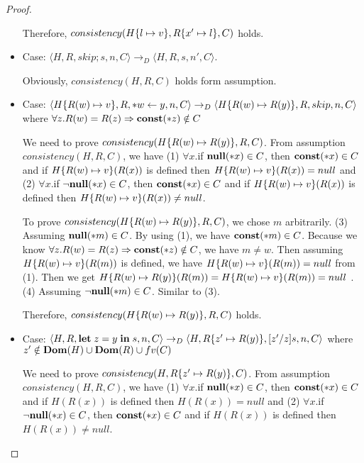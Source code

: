 \begin{proof}
\begin{itemize}
    Therefore, \(consistency(H\{l \mapsto v\}, R\{x' \mapsto l\},
    C )\) holds.

\item Case: \(\langle H, R, skip;s, n, C \rangle \rightarrow_D
    \langle H, R, s, n', C \rangle \).

    Obviously, \(consistency(H, R, C) \) holds form assumption.

\item Case: \(\langle H\{R(w) \mapsto v\}, R, *w \leftarrow y, n, C
  \rangle \rightarrow_D \langle H\{R(w) \mapsto R(y)\}, R, skip, n, C
  \rangle \) where \( \forall z. R(w) = R(z) \Rightarrow \mathbf{const}(*z)
  \notin C \)

    We need to prove \(consistency(H\{R(w) \mapsto R(y)\}, R, C)
    \). From assumption \(consistency(H, R, C)\), we have (1)
    \(\forall x\).if \({\bf null}(*x) \in C\), then \(\mathbf{const}(*x) \in C\) and
    if \(H\{R(w)\mapsto v\}(R(x))\) is defined then \(H\{R(w) \mapsto
      v\}(R(x)) = null\) and (2) \(\forall x\).if \(\neg{\bf null}(*x) \in C\),
    then \(\mathbf{const}(*x) \in C\) and if \(H\{R(w)\mapsto v\}(R(x))\) is
    defined then \(H\{R(w) \mapsto v\}(R(x)) \ne null\).

    To prove \(consistency(H\{R(w) \mapsto R(y)\}, R, C) \), we
    chose \(m\) arbitrarily. (3) Assuming \(\mathbf{null}(*m) \in C\). By
    using (1), we have \(\mathbf{const}(*m) \in C\). Because we know \( \forall
    z. R(w) = R(z) \Rightarrow \mathbf{const}(*z) \notin C \), we have \(m \ne
    w\). Then assuming \(H\{R(w)\mapsto v\}(R(m))\) is defined, we
    have \(H\{R(w)\mapsto v\}(R(m)) = null\) from (1). Then we
    get \(H\{R(w)\mapsto R(y)\}(R(m)) = H\{R(w) \mapsto v\}(R(m))
    = null\) . (4) Assuming \(\neg\mathbf{null}(*m) \in C\). Similar to (3).
    
    Therefore, \(consistency(H\{R(w) \mapsto R(y)\}, R, C)\) holds.

\item Case: \(\langle H, R, \mathbf{let}\; z = y \; \mathbf{in}\; s, n, C
  \rangle \rightarrow_D \langle H, R\{z' \mapsto R(y)\}, [z'/z]s, n, C
  \rangle \) where \(z' \notin \mathbf{Dom}(H)\cup\mathbf{Dom}(R)\cup fv(C) \)
  
  We need to prove \(consistency(H, R\{z'\mapsto R(y)\}, C) \). From
  assumption \(consistency(H, R, C)\), we have (1) \(\forall x\).if
  \({\bf null}(*x) \in C\), then \(\mathbf{const}(*x) \in C\) and if \(H(R(x))\) is
  defined then \(H(R(x)) = null\) and (2) \(\forall x\).if \(\neg{\bf null}(*x)
  \in C\), then \(\mathbf{const}(*x) \in C\) and if \(H(R(x))\) is defined
  then \(H(R(x)) \ne null\).


\end{itemize}
\end{proof}
